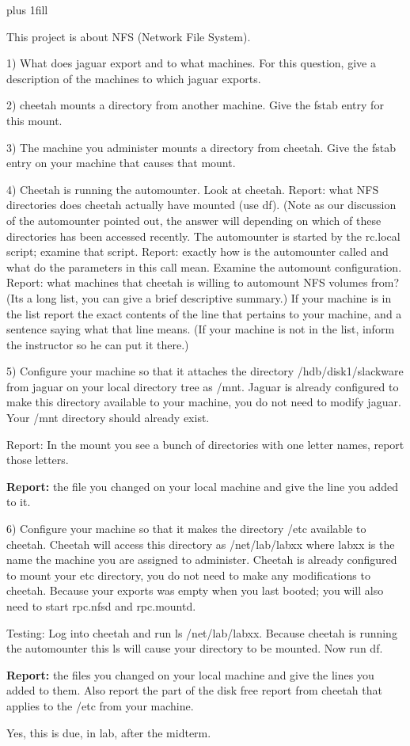 
\rightskip=0pt plus 1fill

\parindent 0pt

This project is about NFS (Network File System).

1) What does jaguar export and to what machines.
For this question, give a description of the machines to which
jaguar exports.

2) cheetah mounts a directory from another machine.
Give the fstab entry for this mount.

3) The machine you administer mounts a directory from cheetah.
Give the fstab entry on your machine that causes that mount.

4) Cheetah is running the automounter.
Look at cheetah. 
Report: what NFS directories does cheetah actually have mounted 
(use {\ltt{}df}).
(Note as our discussion of the automounter pointed out, the answer will
depending on which of these directories has been accessed recently.
The automounter is started by the {\ltt{}rc.local} script;
examine that script.
Report: exactly how is the automounter called and
what do the parameters in this call mean.
Examine the automount configuration.
Report: what machines that cheetah is willing to automount NFS volumes from?
(Its a long list, you can give a brief descriptive summary.)
If your machine is in the list report the exact contents of the
line that pertains to your machine, and a sentence saying what that
line means.
(If your machine is not in the list, inform the instructor so he can put it
there.)

5) Configure your machine so that it attaches the directory
{\ltt{}/hdb/disk1/slackware} from jaguar on your local directory tree
as {\ltt{}/mnt}.
Jaguar is already configured to make this directory available to your
machine, you do not need to modify jaguar.
Your {\ltt{}/mnt} directory should already exist.

Report: In the mount you see a bunch of directories with one letter names,
report those letters.

{\bf Report:} the file you changed on your local machine and give the line
you added to it.

6) Configure your machine so that it makes the directory
{\ltt{}/etc} available to cheetah.
Cheetah will access this directory as {\ltt{}/net/lab/labxx} where {\ltt{}labxx}
is the name the machine you are assigned to administer.
Cheetah is already configured to mount your {\ltt{}etc} directory,
you do not need to make any modifications to cheetah.
Because your {\ltt{}exports} was empty when you last booted;
you will also need to start {\ltt{}rpc.nfsd} and {\ltt{}rpc.mountd}.

Testing: Log into cheetah and run {\ltt{}ls /net/lab/labxx}.
Because cheetah is running the automounter
this {\ltt{}ls} will cause your directory to be mounted.
Now run {\ltt{}df}.

{\bf Report:} the files you changed on your local machine and give the lines 
you added to them.
Also report the part of the disk free report from cheetah that applies to 
the {\ltt{}/etc} from your machine.

Yes, this is due, in lab, after the midterm.
\bye
